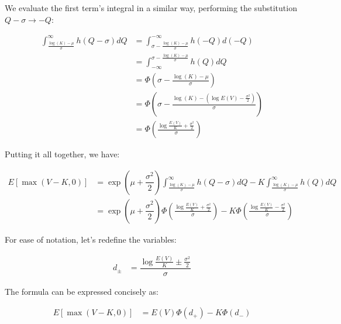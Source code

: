 \documentclass[uplatex]{jsarticle}
\begin{document}
We evaluate the first term's integral in a similar way, performing the substitution $Q-\sigma \to -Q$:

\begin{align}
	\int^{\infty}_{\frac{\log(K) - \mu}{\sigma}} h(Q - \sigma) dQ & = \int^{-\infty}_{\sigma - \frac{\log(K) - \mu}{\sigma}} h(-Q) d(-Q)                                     \\
	                                                              & = \int_{-\infty}^{\sigma - \frac{\log(K) - \mu}{\sigma}} h(Q) dQ                                         \\
	                                                              & = \Phi \left( \sigma - \frac{\log(K) - \mu}{\sigma} \right)                                              \\
	                                                              & = \Phi \left( \sigma - \frac{\log(K) - \left( \log E(V) - \frac{\sigma^{2}}{2} \right) }{\sigma} \right) \\
	                                                              & = \Phi \left( \frac{ \log \frac{E(V)}{K} + \frac{\sigma^{2}}{2} }{\sigma} \right)
\end{align}


Putting it all together, we have:

\begin{align}
	E \left[ \max(V-K,0) \right] & = \exp( \mu + \dfrac{\sigma^{2} }{2}) \int^{\infty}_{\frac{\log(K) - \mu}{\sigma}} h(Q - \sigma) dQ - K \int^{\infty}_{\frac{\log(K) - \mu}{\sigma}} h(Q) dQ                                              \\
	                             & = \exp( \mu + \dfrac{\sigma^{2} }{2}) \Phi \left( \frac{ \log \frac{E(V)}{K} + \frac{\sigma^{2}}{2} }{\sigma} \right) - K \Phi \left( \frac{ \log \frac{E(V)}{K} - \frac{\sigma^{2}}{2} }{\sigma} \right)
\end{align}

For ease of notation, let's redefine the variables:

\begin{align}
	d_{\pm} & = \dfrac{ \log \frac{E(V)}{K} \pm \frac{\sigma^{2}}{2} }{ \sigma }
\end{align}

The formula can be expressed concisely as:

\begin{align}
	E \left[ \max(V-K,0) \right] & = E(V) \Phi (d_{+}) - K \Phi (d_{-})
\end{align}
\end{document}

